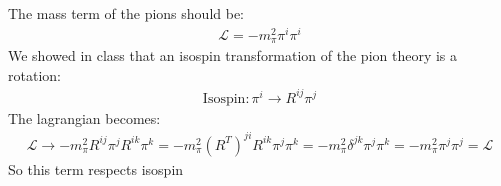 \documentclass[12pt]{article}
\begin{document}
The mass term of the pions should be:
\begin{align*}
  \mathcal{L}=-m_\pi^2\pi^i\pi^i
\end{align*}
We showed in class that an isospin transformation of the pion theory is a rotation:
\begin{align*}
  \text{Isospin}:\pi^i\to R^{ij}\pi^j
\end{align*}
The lagrangian becomes:
\begin{align*}
  \mathcal{L}\to-m_\pi^2R^{ij}\pi^jR^{ik}\pi^k=-m_\pi^2(R^T)^{ji}R^{ik}\pi^j\pi^k=
  -m_\pi^2\delta^{jk}\pi^j\pi^k=-m_\pi^2\pi^j\pi^j=\mathcal{L}
\end{align*}
So this term respects isospin
\end{document}
